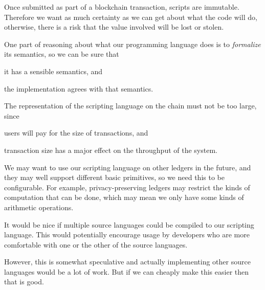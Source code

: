 \begin{requirement}[Safety]
\label{req:script-lang-reasoning}
Once submitted as part of a blockchain transaction, scripts are immutable.
Therefore we want as much certainty as we can get about what the code will do, otherwise, there is a risk that the value involved will be lost or stolen.
\end{requirement}

\begin{requirement}[Formalization]
\label{req:script-lang-formalization}
One part of reasoning about what our programming language does is to \emph{formalize} its semantics, so we can be sure that
\begin{inparaenum}
  \item it has a sensible semantics, and
  \item the implementation agrees with that semantics.
\end{inparaenum}
\end{requirement}

\begin{requirement}[Size]
\label{req:script-lang-size}
The representation of the scripting language on the chain must not be too large, since
\begin{inparaenum}
\item users will pay for the size of transactions, and
\item transaction size has a major effect on the throughput of the system.
\end{inparaenum}
\end{requirement}

\begin{requirement}[Extensibility]
\label{req:script-lang-extensibility}
We may want to use our scripting language on other ledgers in the future, and they may well support different basic primitives, so we need this to be configurable.
For example, privacy-preserving ledgers may restrict the kinds of computation that can be done, which may mean we only have some kinds of arithmetic operations.
\end{requirement}

\begin{requirement}
\label{req:source-lang-multiple}
It would be nice if multiple source languages could be compiled to our scripting language.
This would potentially encourage usage by developers who are more comfortable with one or the other of the source languages.

However, this is somewhat speculative and actually implementing other source languages would be a lot of work.
But if we can cheaply make this easier then that is good.
\end{requirement}

